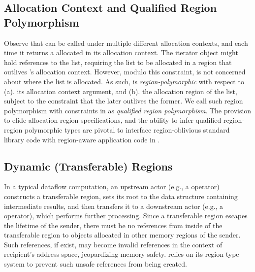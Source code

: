 {\subsection{Allocation Context and Qualified Region Polymorphism}
\label{sec:alloc-ctxt}

Observe that  can be called under multiple different
allocation contexts, and each time it returns a 
allocated in its allocation context. The iterator object might hold
references to the list, requiring the list to be allocated in a region
that outlives \!'s allocation context. However, modulo
this constraint,  is not concerned about where the
list is allocated. As such,  is
\emph{region-polymorphic} with respect to (a). its allocation context
argument, and (b). the allocation region of the list, subject to the
constraint that the later outlives the former. We call such region
polymorphism with constraints in \name as \emph{qualified region
polymorphism}. The provision to elide allocation region
specifications, and the ability to infer qualified region-region
polymorphic types are pivotal to interface region-oblivious standard
library code with region-aware application code in \name. 

\subsection{Dynamic (Transferable) Regions}



In a typical dataflow computation, an upstream actor (e.g., a
 operator) constructs a transferable region, sets its root
to the data structure containing intermediate results, and then
transfers it to a downstream actor (e.g., a  operator), which
performs further processing. Since a transferable region escapes the
lifetime of the sender, there must be no references from inside of the
transferable region to objects allocated in other memory regions of
the sender. Such references, if exist, may become invalid references
in the context of recipient's address space, jeopardizing memory
safety. \name relies on its region type system to prevent such unsafe
references from being created.


}
